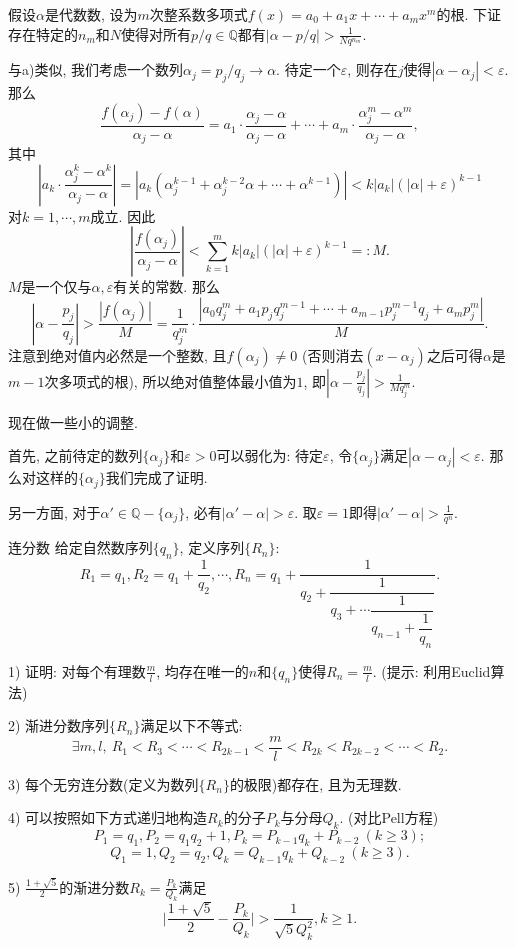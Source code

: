 \begin{solution}
	假设$\alpha$是代数数, 设为$m$次整系数多项式$f(x) = a_0 + a_1x + \cdots + a_mx^m$的根. 下证存在特定的$n_m$和$N$使得对所有$p/q \in \mathbb{Q}$都有$|\alpha - p/q| > \frac{1}{Nq^{n_m}}$. 
	
	与a)类似, 我们考虑一个数列$\alpha _j = p_j/q_j \to \alpha$. 待定一个$\varepsilon$, 则存在$j$使得$|\alpha - \alpha _j |<\varepsilon$. 那么$$\frac{ f(\alpha _j)-f(\alpha) }{\alpha _j - \alpha}  = a_1 \cdot \frac{\alpha _j - \alpha}{\alpha _j - \alpha} + \cdots + a_m \cdot \frac{\alpha _j^m - \alpha ^m}{\alpha _j - \alpha}, $$
	其中$$\left| a_k \cdot \frac{\alpha _j^k - \alpha ^k}{\alpha _j - \alpha} \right| = |a_k(\alpha _j ^{k-1} + \alpha _j ^{k-2} \alpha + \cdots + \alpha ^{k-1})| < k|a_k|(|\alpha |+\varepsilon)^{k-1}$$
	对$k=1,\cdots ,m$成立. 因此$$\left| \frac{f(\alpha _j)}{\alpha _j - \alpha} \right| < \sum_{k=1}^{m} k|a_k|(|\alpha |+\varepsilon)^{k-1} =: M.$$
	$M$是一个仅与$\alpha ,\varepsilon$有关的常数. 那么$$\left|\alpha - \frac{p_j}{q_j}	\right| > \frac{|f(\alpha _j)|}{M} = \frac{1}{q_j^m} \cdot \frac{|a_0q_j^m + a_1p_jq_j^{m-1} + \cdots + a_{m-1}p_j^{m-1}q_j + a_mp_j^{m} |}{M}. $$
	注意到绝对值内必然是一个整数, 且$f(\alpha _j) \neq 0$ (否则消去$(x-\alpha _j)$之后可得$\alpha$是$m-1$次多项式的根), 所以绝对值整体最小值为$1$, 即$\left|\alpha - \frac{p_j}{q_j}	\right| > \frac{1}{Mq_j^m}$. 
	
	现在做一些小的调整. 
	
	首先, 之前待定的数列$\{ \alpha _j \}$和$\varepsilon >0$可以弱化为: 待定$\varepsilon$, 令$\{ \alpha _j \}$满足$|\alpha - \alpha _j |<\varepsilon$. 那么对这样的$\{ \alpha _j \}$我们完成了证明. 
	
	另一方面, 对于$\alpha ' \in \mathbb{Q} - \{ \alpha _j \}$, 必有$|\alpha ' - \alpha|>\varepsilon$. 取$\varepsilon = 1$即得$|\alpha ' - \alpha| > \frac{1}{q^n}$. 
\end{solution}

\begin{exercise}{连分数}
	给定自然数序列$\{ q_n \}$, 定义序列$\{ R_n \}$: $$R_1=q_1, R_2=q_1+\frac{1}{q_2}, \cdots ,R_n = q_1 + \dfrac{1}{q_2 
          + \dfrac{1}{q_3 
          + \cdots \dfrac{1}{q_{n-1}+\dfrac{1}{q_n}}  } }.$$
          
	1) 证明: 对每个有理数$\frac{m}{l}$, 均存在唯一的$n$和$\{ q_n \}$使得$R_n=\frac{m}{l}$. (提示: 利用Euclid算法)

	2) 渐进分数序列$\{ R_n \}$满足以下不等式: $$\exists m,l,~ R_1<R_3< \cdots <R_{2k-1} < \frac{m}{l} < R_{2k} < R_{2k-2} < \cdots < R_2.$$

	3) 每个无穷连分数(定义为数列$\{ R_n \}$的极限)都存在, 且为无理数. 

	4) 可以按照如下方式递归地构造$R_k$的分子$P_k$与分母$Q_k$. (对比Pell方程)
	$$P_1=q_1, P_2=q_1q_2+1, P_k=P_{k-1}q_k+P_{k-2}~(k \geq 3); $$
	$$Q_1=1, Q_2=q_2, Q_k=Q_{k-1}q_k+Q_{k-2}~(k \geq 3).$$

	5) $\frac{1+\sqrt{5}}{2}$的渐进分数$R_k=\frac{P_k}{Q_k}$满足$$\big| \frac{1+\sqrt{5}}{2} - \frac{P_k}{Q_k} \big|>\frac{1}{\sqrt{5} Q_k^2}, k \geq 1.$$
\end{exercise}

